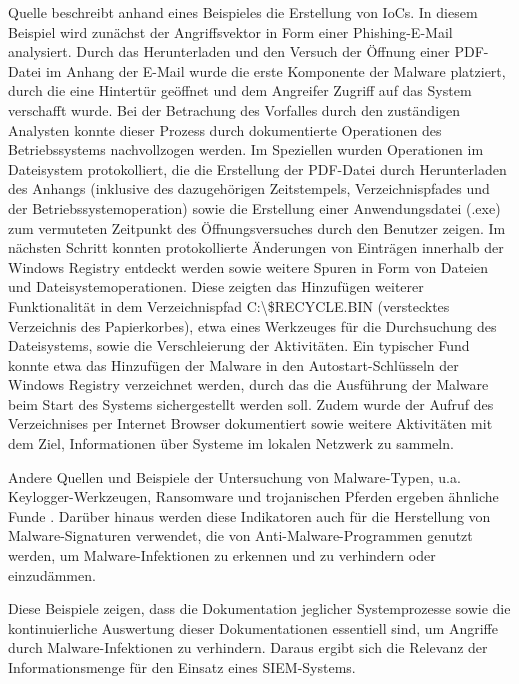 
Quelle \citep{EntAnalysis1} beschreibt anhand eines Beispieles die Erstellung von IoCs. In diesem Beispiel wird zunächst der Angriffsvektor in Form einer Phishing-E-Mail analysiert. Durch das Herunterladen und den Versuch der Öffnung einer PDF-Datei im Anhang der E-Mail wurde die erste Komponente der Malware platziert, durch die eine Hintertür geöffnet und dem Angreifer Zugriff auf das System verschafft wurde. Bei der Betrachung des Vorfalles durch den zuständigen Analysten konnte dieser Prozess durch dokumentierte Operationen des Betriebssystems nachvollzogen werden. Im Speziellen wurden Operationen im Dateisystem protokolliert, die die Erstellung der PDF-Datei durch Herunterladen des Anhangs (inklusive des dazugehörigen Zeitstempels, Verzeichnispfades und der Betriebssystemoperation) sowie die Erstellung einer Anwendungsdatei (.exe) zum vermuteten Zeitpunkt des Öffnungsversuches durch den Benutzer zeigen. 
Im nächsten Schritt konnten protokollierte Änderungen von Einträgen innerhalb der Windows Registry entdeckt werden sowie weitere Spuren in Form von Dateien und Dateisystemoperationen. Diese zeigten das Hinzufügen weiterer Funktionalität in dem Verzeichnispfad \glqq C:\textbackslash \$RECYCLE.BIN\grqq{} (verstecktes Verzeichnis des Papierkorbes), etwa eines Werkzeuges für die Durchsuchung des Dateisystems,  sowie die Verschleierung der Aktivitäten. Ein typischer Fund konnte etwa das Hinzufügen der Malware in den Autostart-Schlüsseln der Windows Registry verzeichnet werden, durch das die Ausführung der Malware beim Start des Systems sichergestellt werden soll.
Zudem wurde der Aufruf des Verzeichnises per Internet Browser dokumentiert sowie weitere Aktivitäten mit dem Ziel, Informationen über Systeme im lokalen Netzwerk zu sammeln. 

Andere Quellen und Beispiele der Untersuchung von Malware-Typen, u.a. Keylogger-Werkzeugen, Ransomware und trojanischen Pferden ergeben ähnliche Funde \citep{EntAnalysis2}. 
Darüber hinaus werden diese Indikatoren auch für die Herstellung von Malware-Signaturen verwendet, die von Anti-Malware-Programmen genutzt werden, um Malware-Infektionen zu erkennen und zu verhindern oder einzudämmen.

Diese Beispiele zeigen, dass die Dokumentation jeglicher Systemprozesse sowie die kontinuierliche Auswertung dieser Dokumentationen essentiell sind, um Angriffe durch Malware-Infektionen zu verhindern. Daraus ergibt sich die Relevanz der Informationsmenge für den Einsatz eines SIEM-Systems.